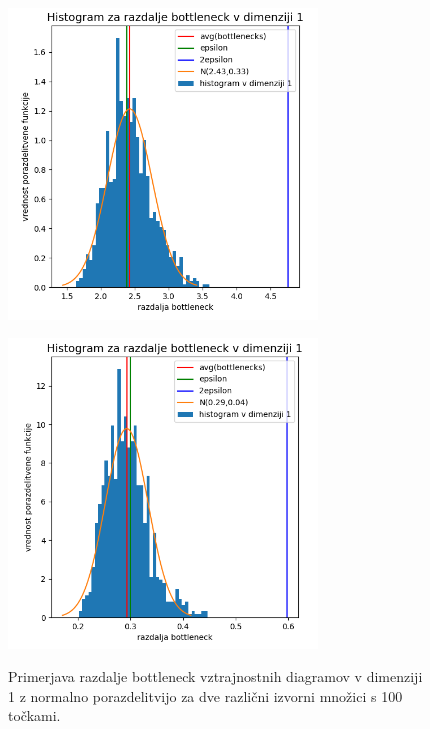 \documentclass[a4paper,11pt]{article}
\theoremstyle{definition}
\theoremstyle{plain}
\begin{document}
\begin{figure}[ht!]
    \begin{minipage}{0.5\textwidth}
        \centering
        \includegraphics[width=82mm]{../slike/bottleneck_1000_dim1.png}
        \label{slika:hist1_1}
    \end{minipage}\hfill
    \begin{minipage}{0.5\textwidth}
        \centering
        \includegraphics[width=82mm]{../slike/bottleneck2_1000_dim1.png}
        \label{slika:hist2_1}
    \end{minipage}\hfill
    \caption{Primerjava razdalje bottleneck vztrajnostnih diagramov v dimenziji 1 z normalno porazdelitvijo za dve različni izvorni množici s 100 točkami.}
\end{figure}
\end{document}
